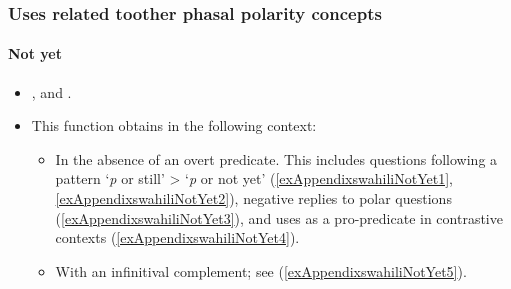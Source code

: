 \subsubsection{Uses related toother phasal polarity concepts}
\paragraph{Not yet}\label{appendixSwahiliNotYet}
\begin{itemize}
	\item \textcite[85]{Sacleux19391941}, \textcite{TUKI2014} and \textcite{VeselinovaDevos2021}.
	\item This function obtains in the following context:
	\begin{itemize}
		\item In the absence of an overt predicate. This includes questions following a pattern \lq \textit{p} or still\rq{} > \lq{}\textit{p} or not yet\rq{ }(\ref{exAppendixswahiliNotYet1}, \ref{exAppendixswahiliNotYet2}), negative replies to polar questions (\ref{exAppendixswahiliNotYet3}), and uses as a pro-predicate in contrastive contexts (\ref{exAppendixswahiliNotYet4}).
		\item With an infinitival complement; see (\ref{exAppendixswahiliNotYet5}). 
	\end{itemize}
\end{itemize}


